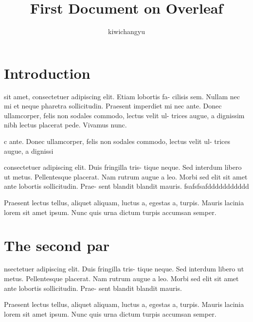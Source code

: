 \documentclass[12pt]{article}
\author{kiwichangyu}
\title{First Document on Overleaf}
\begin{document}
\maketitle

\section{Introduction}


\doublespacing
 sit amet, consectetuer adipiscing elit. Etiam lobortis fa- cilisis sem. Nullam nec mi et neque pharetra sollicitudin. Praesent imperdiet mi nec ante. Donec ullamcorper, felis non sodales commodo, lectus velit ul- trices augue, a dignissim nibh lectus placerat pede. Vivamus nunc.

 c ante. Donec ullamcorper, felis non sodales commodo, lectus velit ul- trices augue, a dignissi

\singlespacing

consectetuer adipiscing elit. Duis fringilla tris- tique neque. Sed interdum libero ut metus. Pellentesque placerat. Nam rutrum augue a leo. Morbi sed elit sit amet ante lobortis sollicitudin. Prae- sent blandit blandit mauris.
\onehalfspacing %
fsafsfsafddddddddddd

\doublespacing
Praesent lectus tellus, aliquet aliquam, luctus a, egestas a, turpis. Mauris lacinia lorem sit amet ipsum. Nunc quis urna dictum turpis accumsan semper.

\section{The second par}
\linespread{2} %
nsectetuer adipiscing elit. Duis fringilla tris- tique neque. Sed interdum libero ut metus. Pellentesque placerat. Nam rutrum augue a leo. Morbi sed elit sit amet ante lobortis sollicitudin. Prae- sent blandit blandit mauris.

\singlespacing
Praesent lectus tellus, aliquet aliquam, luctus a, egestas a, turpis. Mauris lacinia lorem sit amet ipsum. Nunc quis urna dictum turpis accumsan semper.
\end{document}
